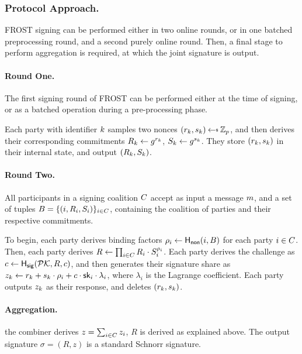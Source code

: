 \subsubsection{Protocol Approach.}

FROST signing can be performed either in two online rounds,
or in one batched preprocessing round,
and a second purely online round.
Then, a final stage to perform aggregation is required,
at which the joint signature is output.

\paragraph{Round One.}
The first signing round of FROST can be performed either at the time of signing,
or as a batched operation during a pre-processing phase.

Each party with identifier $k$ samples two nonces $(r_\partyid, s_\partyid) \randpick \Zp$,
and then derives their corresponding commitments $R_k \gets g^{r_k}$, $ S_k \gets g^{s_k}$.
They store $(r_k, s_k)$ in their internal state,
and output $(R_k, S_k)$.

\paragraph{Round Two.}
All participants in a signing coalition $C$ accept as input a message $m$,
and a set of tuples $B = \{ (i, R_i, S_i)\}_{i \in C}$,
containing the coalition of parties and their respective commitments.

To begin,
each party derives binding factors $\rho_i \gets \mathsf{H_{non}}(i, B)$ for each party $i \in C$.
Then, each party derives $R \gets \prod_{i \in C} R_i \cdot S_i^{\rho_i}$.
Each party derives the challenge as $c \gets \mathsf{H_{sig}}(\mathcal{PK}, R, c)$,
and then generates their signature share as
$z_k \gets r_k + s_k \cdot \rho_i + c \cdot \mathsf{sk}_i \cdot \lambda_i$,
where $\lambda_i$ is the Lagrange coefficient.
Each party outputs $z_k$ as their response,
and deletes $(r_k, s_k)$.


\paragraph{Aggregation.}
the combiner derives $z = \sum_{i \in C} z_i$,
$R$ is derived as explained above.
The output signature $\sigma = (R,z)$ is a standard Schnorr signature.

